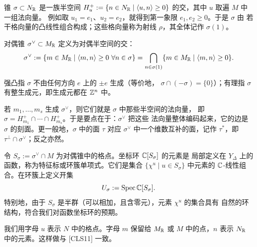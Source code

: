 \begin{definition}[锥]\label{def:cone}
锥 $\sigma\subset N_{\mathbb{R}}$ 是一族半空间
$H_u^+ := \{n\in N_{\mathbb{R}}\mid \langle u,n\rangle\ge 0\}$ 的交，其中 $u$ 取遍 $M$ 中一组法向量。
例如取 $u_1 = e_1$、$u_2 = e_2$，就得到第一象限 $e_1,e_2\ge 0$。于是 $\sigma$ 由
若干格向量的凸线性组合构成；这些格向量称为射线 $\rho$，其全体记作 $\sigma(1)$。

对偶锥 $\sigma^\vee\subset M_{\mathbb{R}}$ 定义为对偶半空间的交：
\[
\sigma^\vee := \{m\in M_{\mathbb{R}}\mid \langle m,n\rangle\ge 0\ \forall n\in\sigma\}
= \bigcap_{n\in\sigma(1)}\{m\in M_{\mathbb{R}}\mid \langle m,n\rangle\ge 0\}.
\]
\end{definition}

\begin{definition}[强凸有理多面体锥]
强凸指 $\sigma$ 不由任何方向 $e$ 上的 $\pm e$ 生成（等价地，
$\sigma\cap(-\sigma)=\{0\}$）；有理指 $\sigma$ 有整生成元，即生成元都在 $\mathbb{Z}^n$ 中。
\end{definition}

\begin{remark}
若 $m_1,\dots,m_s$ 生成 $\sigma^\vee$，则它们就是 $\sigma$ 中那些半空间的法向量，
即 $\sigma = H_{m_1}^+\cap\cdots\cap H_{m_s}^+$。于是要点在于：$\sigma^\vee$ 把这些
法向量整体编码起来，它的边是 $\sigma$ 的刻面。更一般地，$\sigma$ 中的面 $\tau$
对应 $\sigma^\vee$ 中一个维数互补的面，记作 $\tau^*$，即
$\tau^\perp\cap\sigma^\vee$；反之亦然。
\end{remark}


\begin{definition}[特征标]\label{def:character}
令 $S_\sigma := \sigma^\vee\cap M$ 为对偶锥中的格点。坐标环 $\mathbb{C}[S_\sigma]$ 的元素是
局部定义在 $Y_\Delta$ 上的函数，称为特征标或环簇单项式。它们是集合
$\{\chi^u\mid u\in S_\sigma\}$ 中元素的 $\mathbb{C}$-线性组合。在环簇上定义开集
\[
U_\sigma := \operatorname{Spec}\mathbb{C}[S_\sigma].
\]
特别地，由于 $S_\sigma$ 是半群（可以相加，且含零元），元素 $\chi^u$ 的集合具有
自然的环结构，符合我们对函数坐标环的预期。
\end{definition}

\begin{remark}[记号]
我们用字母 $u$ 表示 $N$ 中的格点。字母 $m$ 保留给 $M_{\mathbb{R}}$ 或 $M$ 中的点，$n$ 表示
$N_{\mathbb{R}}$ 中的元素。这样做与 [CLS11] 一致。
\end{remark}

